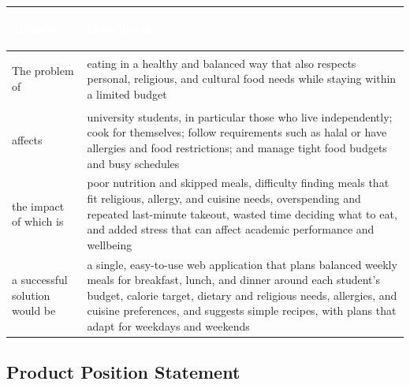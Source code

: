 \documentclass[11pt,a4paper]{article}
\begin{document}
\begin{tabularx}{\textwidth}{>{\bfseries\raggedright\arraybackslash}p{} Y}
\toprule
{}\textcolor{white}{\textbf{Element}} & \textcolor{white}{\textbf{Description}} \\
\midrule
The problem of & eating in a healthy and balanced way that also respects personal, religious, and cultural food needs while staying within a limited budget \\
affects & university students, in particular those who live independently; cook for themselves; follow requirements such as halal or have allergies and food restrictions; and manage tight food budgets and busy schedules \\
the impact of which is & poor nutrition and skipped meals, difficulty finding meals that fit religious, allergy, and cuisine needs, overspending and repeated last-minute takeout, wasted time deciding what to eat, and added stress that can affect academic performance and wellbeing \\
a successful solution would be & a single, easy-to-use web application that plans balanced weekly meals for breakfast, lunch, and dinner around each student's budget, calorie target, dietary and religious needs, allergies, and cuisine preferences, and suggests simple recipes, with plans that adapt for weekdays and weekends \\
\bottomrule
\end{tabularx}

\subsection{Product Position Statement}
\end{document}
